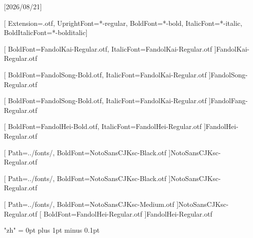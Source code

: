 
[2026/08/21]

\setsansfont{texgyreheros}[     %
Extension=.otf,
UprightFont=*-regular,
BoldFont=*-bold,
ItalicFont=*-italic,
BoldItalicFont=*-bolditalic]





[
	BoldFont=FandolKai-Regular.otf, ItalicFont=FandolKai-Regular.otf
]{FandolKai-Regular.otf}

[
	BoldFont=FandolSong-Bold.otf,
	ItalicFont=FandolKai-Regular.otf
]{FandolSong-Regular.otf}

[
	BoldFont=FandolSong-Bold.otf,
	ItalicFont=FandolKai-Regular.otf
]{FandolFang-Regular.otf}

[
	BoldFont=FandolHei-Bold.otf,
	ItalicFont=FandolHei-Regular.otf
]{FandolHei-Regular.otf}

[
	Path=../fonts/,
	BoldFont=NotoSansCJKsc-Black.otf
]{NotoSansCJKsc-Regular.otf}

[
	Path=../fonts/,
	BoldFont=NotoSansCJKsc-Black.otf
]{NotoSansCJKsc-Regular.otf}

[
	Path=../fonts/,
	BoldFont=NotoSansCJKsc-Medium.otf
]{NotoSansCJKsc-Regular.otf}	%
[
	BoldFont=FandolHei-Regular.otf
]{FandolHei-Regular.otf}	%

\XeTeXlinebreaklocale "zh"
\XeTeXlinebreakskip = 0pt plus 1pt minus 0.1pt

\newcommand\kaishu{\CJKfamily{kai}} %
\newcommand\songti{\CJKfamily{song}} %
\newcommand\heiti{\CJKfamily{hei}}	%
\newcommand\thmheiti{\CJKfamily{hei2}}	%
\newcommand\fangsong{\CJKfamily{fangsong}} %
\renewcommand{\em}{\bfseries\CJKfamily{emfont}} %
